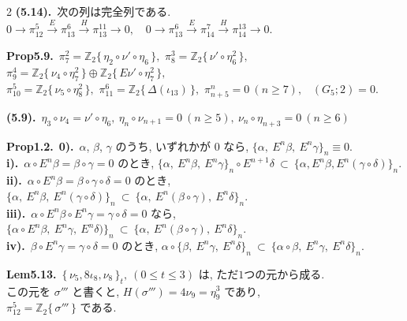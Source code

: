 \documentclass[10pt, leqno]{ltjsarticle}
\newcommand{\Ex}{E}        %
\newcommand{\todai}[2][]{\{\,#2\,\}_{#1}}      %
\newcommand{\gen}[1]{\{\,#1\,\}}       %
\numberwithin{equation}{section}
\theoremstyle{plain}
\theoremstyle{definition}
\theoremstyle{remark}
\begin{document}
\begin{paracol}{2}
\noindent
\textbf{(5.14).}\
次の列は完全列である.\\
\(
0\to \pi^{5}_{12}\xrightarrow{E}\pi^{6}_{13}\xrightarrow{H}\pi^{11}_{13}\to0,
\quad
0\to \pi^{6}_{13}\xrightarrow{E}\pi^{7}_{14}\xrightarrow{H}\pi^{13}_{14}\to0 .
\)

\noindent
\textbf{Prop5.9.}\
\(\pi^{2}_{7}=\mathbb Z_2\gen{\eta_{2}\circ\nu'\circ\eta_6},\) \quad
\(\pi^{3}_{8}=\mathbb Z_2\gen{\nu'\circ\eta_6^2},\) \quad
\(\pi^{4}_{9}=\mathbb Z_2\gen{\nu_{4}\circ\eta_7^2}\oplus \mathbb Z_2\gen{E\nu'\circ\eta_7^2},\) \\
\(\pi^{5}_{10}=\mathbb Z_2\gen{\nu_{5}\circ\eta_8^2},\) \quad
\(\pi^{6}_{11}=\mathbb Z_2\gen{\Delta(\iota_{13})},\) \quad
\(\pi^{n}_{n+5}=0\ (n\ge7),\) \
\((G_{5};2)=0.\)

\noindent
\textbf{(5.9).}\
\(\eta_3\circ \nu_4= \nu'\circ \eta_6,\
\eta_n\circ \nu_{n+1}=0\ (n\ge5),\
\nu_n\circ \eta_{n+3}=0\ (n\ge6)\)

\noindent
\textbf{Prop1.2.}\
\textbf{0).}\ $\alpha$, $\beta$, $\gamma$ のうち, いずれかが $0$ なら,
\(
\{\alpha,\ \Ex^n\beta,\ \Ex^n\gamma\}_n\equiv0.
\)\\
\textbf{i).}\ $\alpha\circ \Ex^n\beta=\beta\circ\gamma=0$ のとき,
\(
\{\alpha,\ \Ex^n\beta,\ \Ex^n\gamma\}_n\circ\Ex^{n+1}\delta\ \subset\ \{\alpha,\Ex^n \beta, \Ex^n(\gamma\circ\delta)\}_n.
\)\\
\textbf{ii).}\ $\alpha\circ \Ex^n\beta=\beta\circ\gamma\circ\delta=0$ のとき,
\(
\{\alpha,\ \Ex^n\beta,\ \Ex^n(\gamma\circ\delta)\}_n\ \subset\ \{\alpha,\ \Ex^n(\beta\circ\gamma),\ \Ex^n\delta\}_n .
\)\\
\textbf{iii).}\ $\alpha\circ\Ex^n\beta\circ\Ex^n\gamma=\gamma\circ\delta=0$ なら,
\(
\{\alpha\circ\Ex^n\beta,\ \Ex^n\gamma,\ \Ex^n\delta)\}_n\ \subset\ \{\alpha,\ \Ex^n(\beta\circ\gamma),\ \Ex^n\delta\}_n .
\)\\
\textbf{iv).}\ $\beta\circ\Ex^n\gamma=\gamma\circ\delta=0$ のとき,
\(
\alpha\circ\{\beta,\ \Ex^n\gamma,\ \Ex^n\delta\}_n\ \subset\ \{\alpha\circ\beta,\ \Ex^n\gamma,\ \Ex^n\delta\}_n .
\)

\noindent
\textbf{Lem5.13.}\
\(\todai[t]{\nu_5,8\iota_8,\nu_8},\ (0\leq t\leq3)\) 
は, ただ$1$つの元から成る. \\
この元を \(\sigma'''\) と書くと, 
\(H(\sigma''')=4\nu_9=\eta_9^3\) であり, \\
\(\pi_{12}^5=\mathbb{Z}_2\gen{\sigma'''}\)
である. 







\end{paracol}
\end{document}
